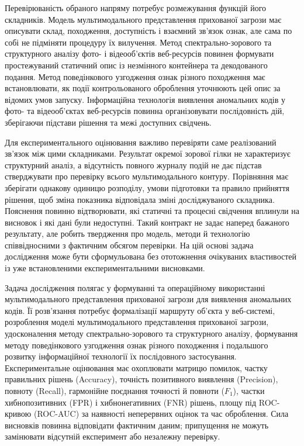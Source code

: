 Перевірюваність обраного напряму потребує розмежування функцій його складників. Модель мультимодального представлення прихованої загрози має описувати склад, походження, доступність і взаємний зв’язок ознак, але сама по собі не підміняти процедуру їх вилучення. Метод спектрально-зорового та структурного аналізу фото- і відеооб’єктів веб-ресурсів повинен формувати простежуваний статичний опис із незмінного контейнера та декодованого подання. Метод поведінкового узгодження ознак різного походження має встановлювати, як події контрольованого оброблення уточнюють цей опис за відомих умов запуску. Інформаційна технологія виявлення аномальних кодів у фото- та відеооб’єктах веб-ресурсів повинна організовувати послідовність дій, зберігаючи підстави рішення та межі доступних свідчень.

Для експериментального оцінювання важливо перевіряти саме реалізований зв’язок між цими складниками. Результат окремої зорової гілки не характеризує структурний аналіз, а відсутність повного журналу подій не дає підстав стверджувати про перевірку всього мультимодального контуру. Порівняння має зберігати однакову одиницю розподілу, умови підготовки та правило прийняття рішення, щоб зміна показника відповідала зміні досліджуваного складника. Пояснення повинно відтворювати, які статичні та процесні свідчення вплинули на висновок і які дані були недоступні. Такий контракт не задає наперед бажаного результату, але робить твердження про модель, методи й технологію співвідносними з фактичним обсягом перевірки. На цій основі задача дослідження може бути сформульована без ототожнення очікуваних властивостей із уже встановленими експериментальними висновками.

Задача дослідження полягає у формуванні та операційному використанні мультимодального представлення прихованої загрози для виявлення аномальних кодів. Її розв’язання потребує формалізації маршруту об’єкта у веб-системі, розроблення моделі мультимодального представлення прихованої загрози, удосконалення методу спектрально-зорового та структурного аналізу, формування методу поведінкового узгодження ознак різного походження і подальшого розвитку інформаційної технології їх послідовного застосування. Експериментальне оцінювання має охоплювати матрицю помилок, частку правильних рішень (Accuracy), точність позитивного виявлення (Precision), повноту (Recall), гармонійне поєднання точності й повноти ($F_1$), частки хибнопозитивних (FPR) і хибнонегативних (FNR) рішень, площу під ROC-кривою (ROC-AUC) за наявності неперервних оцінок та час оброблення. Сила висновків повинна відповідати фактичним даним; припущення не можуть замінювати відсутній експеримент або незалежну перевірку.


